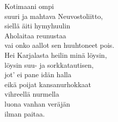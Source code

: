 
Kotimaani ompi  \\ suuri ja mahtava Neuvostoliitto, \\ siellä äiti hymyhuulin \\ Aholaitaa reunustaa \\ vai onko aallot sen huuhtoneet pois. \\ Hei Karjalasta heilin minä löysin, \\ löysin suu- ja sorkkatautisen, \\ jot' ei pane idän halla \\ eikä poijat kansanurhokkaat \\ vihreellä nurmella \\ luona vanhan veräjän \\ ilman paitaa.